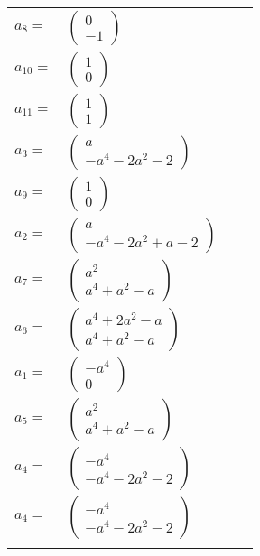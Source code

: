 \documentclass[1p]{elsarticle_modified}
\theoremstyle{definition}
\begin{document}
\begin{tabular}{m{7pt} m{180pt} m{7pt} m{180pt} }
\flushright $a_{8}=$&$\begin{pmatrix}0\\-1\end{pmatrix}$ \\
\flushright $a_{10}=$&$\begin{pmatrix}1\\0\end{pmatrix}$ \\
\flushright $a_{11}=$&$\begin{pmatrix}1\\1\end{pmatrix}$ \\
\flushright $a_{3}=$&$\begin{pmatrix}a\\- a^4-2 a^2-2\end{pmatrix}$ \\
\flushright $a_{9}=$&$\begin{pmatrix}1\\0\end{pmatrix}$ \\
\flushright $a_{2}=$&$\begin{pmatrix}a\\- a^4-2 a^2+a-2\end{pmatrix}$ \\
\flushright $a_{7}=$&$\begin{pmatrix}a^2\\a^4+a^2- a\end{pmatrix}$ \\
\flushright $a_{6}=$&$\begin{pmatrix}a^4+2 a^2- a\\a^4+a^2- a\end{pmatrix}$ \\
\flushright $a_{1}=$&$\begin{pmatrix}- a^4\\0\end{pmatrix}$ \\
\flushright $a_{5}=$&$\begin{pmatrix}a^2\\a^4+a^2- a\end{pmatrix}$ \\
\flushright $a_{4}=$&$\begin{pmatrix}- a^4\\- a^4-2 a^2-2\end{pmatrix}$\\ \flushright $a_{4}=$&$\begin{pmatrix}- a^4\\- a^4-2 a^2-2\end{pmatrix}$\\&\end{tabular}
\end{document}
